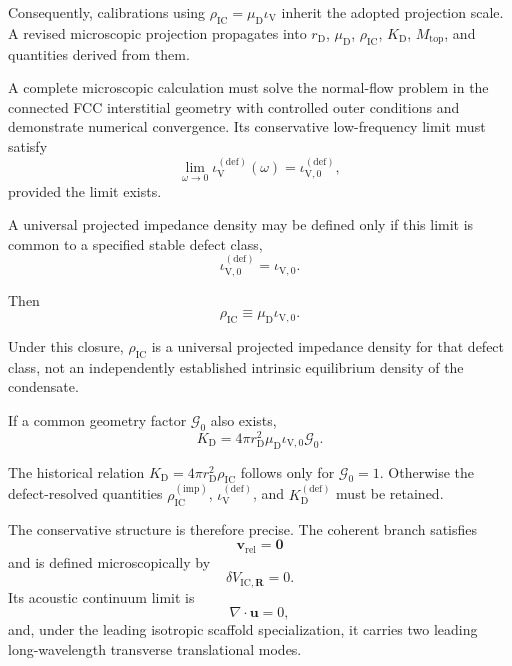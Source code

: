 Consequently, calibrations using $\rho_{\mathrm{IC}}=\mu_{\mathrm{D}}\iota_{\mathrm{V}}$ inherit the adopted projection scale. A revised microscopic projection propagates into $r_{\mathrm{D}}$, $\mu_{\mathrm{D}}$, $\rho_{\mathrm{IC}}$, $K_{\mathrm{D}}$, $M_{\mathrm{top}}$, and quantities derived from them.

A complete microscopic calculation must solve the normal-flow problem in the connected FCC interstitial geometry with controlled outer conditions and demonstrate numerical convergence. Its conservative low-frequency limit must satisfy
\begin{equation}
    \lim_{\omega\rightarrow0}
    \iota_{\mathrm{V}}^{(\mathrm{def})}(\omega)
    =
    \iota_{\mathrm{V},0}^{(\mathrm{def})},
\end{equation}
provided the limit exists.

A universal projected impedance density may be defined only if this limit is common to a specified stable defect class,
\begin{equation}
    \iota_{\mathrm{V},0}^{(\mathrm{def})}
    =
    \iota_{\mathrm{V},0}.
\end{equation}

Then
\begin{equation}
    \rho_{\mathrm{IC}}
    \equiv
    \mu_{\mathrm{D}}
    \iota_{\mathrm{V},0}.
\end{equation}

Under this closure, $\rho_{\mathrm{IC}}$ is a universal projected impedance density for that defect class, not an independently established intrinsic equilibrium density of the condensate.

If a common geometry factor $\mathcal{G}_0$ also exists,
\begin{equation}
    K_{\mathrm{D}}
    =
    4\pi r_{\mathrm{D}}^2
    \mu_{\mathrm{D}}
    \iota_{\mathrm{V},0}
    \mathcal{G}_0.
\end{equation}

The historical relation $K_{\mathrm{D}}=4\pi r_{\mathrm{D}}^2\rho_{\mathrm{IC}}$ follows only for $\mathcal{G}_0=1$. Otherwise the defect-resolved quantities $\rho_{\mathrm{IC}}^{(\mathrm{imp})}$, $\iota_{\mathrm{V}}^{(\mathrm{def})}$, and $K_{\mathrm{D}}^{(\mathrm{def})}$ must be retained.

The conservative structure is therefore precise. The coherent branch satisfies
\begin{equation}
    \mathbf{v}_{\mathrm{rel}}
    =
    \mathbf{0}
\end{equation}
and is defined microscopically by
\begin{equation}
    \delta V_{\mathrm{IC},\mathbf{R}}
    =
    0.
\end{equation}
Its acoustic continuum limit is
\begin{equation}
    \nabla\cdot\mathbf{u}
    =
    0,
\end{equation}
and, under the leading isotropic scaffold specialization, it carries two leading long-wavelength transverse translational modes.

